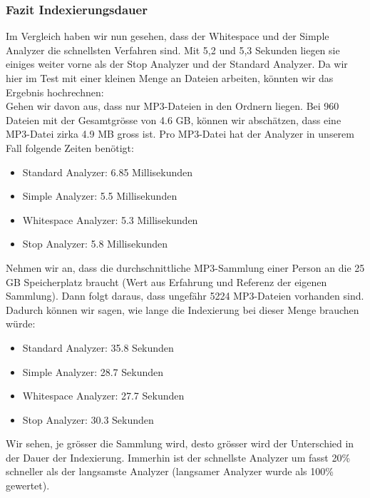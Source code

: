\documentclass[12pt,a4paper,ngerman]{report}
\begin{document}
\subsubsection{Fazit Indexierungsdauer}
Im Vergleich haben wir nun gesehen, dass der Whitespace und der Simple Analyzer die schnellsten Verfahren sind. Mit 5,2 und 5,3 Sekunden liegen sie einiges weiter vorne als der Stop Analyzer und der Standard Analyzer. Da wir hier im Test mit einer kleinen Menge an Dateien arbeiten, könnten wir das Ergebnis hochrechnen:\\
Gehen wir davon aus, dass nur MP3-Dateien in den Ordnern liegen. Bei 960 Dateien mit der Gesamtgrösse von 4.6 GB, können wir abschätzen, dass eine MP3-Datei zirka 4.9 MB gross ist. Pro MP3-Datei hat der Analyzer in unserem Fall folgende Zeiten benötigt:
\begin{itemize}
	\item Standard Analyzer: 6.85 Millisekunden
	\item Simple Analyzer: 5.5 Millisekunden
	\item Whitespace Analyzer: 5.3 Millisekunden
	\item Stop Analyzer: 5.8 Millisekunden
\end{itemize}
Nehmen wir an, dass die durchschnittliche MP3-Sammlung einer Person an die 25 GB Speicherplatz braucht (Wert aus Erfahrung und Referenz der eigenen Sammlung). Dann folgt daraus, dass ungefähr 5224 MP3-Dateien vorhanden sind. Dadurch können wir sagen, wie lange die Indexierung bei dieser Menge brauchen würde:
\begin{itemize}
	\item Standard Analyzer: 35.8 Sekunden
	\item Simple Analyzer: 28.7 Sekunden
	\item Whitespace Analyzer: 27.7 Sekunden
	\item Stop Analyzer: 30.3 Sekunden
\end{itemize}
Wir sehen, je grösser die Sammlung wird, desto grösser wird der Unterschied in der Dauer der Indexierung. Immerhin ist der schnellste Analyzer um fasst 20\% schneller als der langsamste Analyzer (langsamer Analyzer wurde als 100\% gewertet).
\end{document}
